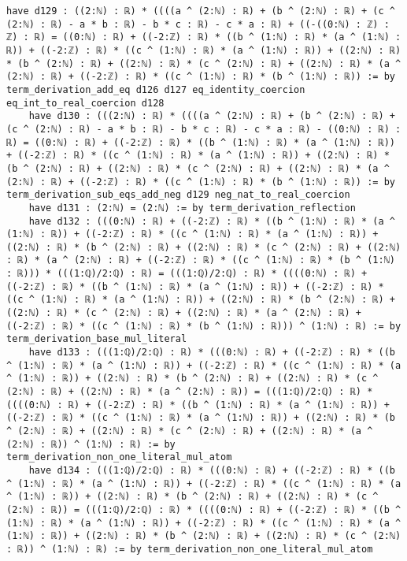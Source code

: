 \documentclass{article}
\begin{document}
\begin{tcolorbox}[colback=white!10, width=\linewidth]
\begin{lstlisting}[language=Lean4]
    have d129 : ((2:ℕ) : ℝ) * ((((a ^ (2:ℕ) : ℝ) + (b ^ (2:ℕ) : ℝ) + (c ^ (2:ℕ) : ℝ) - a * b : ℝ) - b * c : ℝ) - c * a : ℝ) + ((-((0:ℕ) : ℤ) : ℤ) : ℝ) = ((0:ℕ) : ℝ) + ((-2:ℤ) : ℝ) * ((b ^ (1:ℕ) : ℝ) * (a ^ (1:ℕ) : ℝ)) + ((-2:ℤ) : ℝ) * ((c ^ (1:ℕ) : ℝ) * (a ^ (1:ℕ) : ℝ)) + ((2:ℕ) : ℝ) * (b ^ (2:ℕ) : ℝ) + ((2:ℕ) : ℝ) * (c ^ (2:ℕ) : ℝ) + ((2:ℕ) : ℝ) * (a ^ (2:ℕ) : ℝ) + ((-2:ℤ) : ℝ) * ((c ^ (1:ℕ) : ℝ) * (b ^ (1:ℕ) : ℝ)) := by term_derivation_add_eq d126 d127 eq_identity_coercion eq_int_to_real_coercion d128
    have d130 : (((2:ℕ) : ℝ) * ((((a ^ (2:ℕ) : ℝ) + (b ^ (2:ℕ) : ℝ) + (c ^ (2:ℕ) : ℝ) - a * b : ℝ) - b * c : ℝ) - c * a : ℝ) - ((0:ℕ) : ℝ) : ℝ) = ((0:ℕ) : ℝ) + ((-2:ℤ) : ℝ) * ((b ^ (1:ℕ) : ℝ) * (a ^ (1:ℕ) : ℝ)) + ((-2:ℤ) : ℝ) * ((c ^ (1:ℕ) : ℝ) * (a ^ (1:ℕ) : ℝ)) + ((2:ℕ) : ℝ) * (b ^ (2:ℕ) : ℝ) + ((2:ℕ) : ℝ) * (c ^ (2:ℕ) : ℝ) + ((2:ℕ) : ℝ) * (a ^ (2:ℕ) : ℝ) + ((-2:ℤ) : ℝ) * ((c ^ (1:ℕ) : ℝ) * (b ^ (1:ℕ) : ℝ)) := by term_derivation_sub_eqs_add_neg d129 neg_nat_to_real_coercion
    have d131 : (2:ℕ) = (2:ℕ) := by term_derivation_reflection
    have d132 : (((0:ℕ) : ℝ) + ((-2:ℤ) : ℝ) * ((b ^ (1:ℕ) : ℝ) * (a ^ (1:ℕ) : ℝ)) + ((-2:ℤ) : ℝ) * ((c ^ (1:ℕ) : ℝ) * (a ^ (1:ℕ) : ℝ)) + ((2:ℕ) : ℝ) * (b ^ (2:ℕ) : ℝ) + ((2:ℕ) : ℝ) * (c ^ (2:ℕ) : ℝ) + ((2:ℕ) : ℝ) * (a ^ (2:ℕ) : ℝ) + ((-2:ℤ) : ℝ) * ((c ^ (1:ℕ) : ℝ) * (b ^ (1:ℕ) : ℝ))) * (((1:ℚ)/2:ℚ) : ℝ) = (((1:ℚ)/2:ℚ) : ℝ) * ((((0:ℕ) : ℝ) + ((-2:ℤ) : ℝ) * ((b ^ (1:ℕ) : ℝ) * (a ^ (1:ℕ) : ℝ)) + ((-2:ℤ) : ℝ) * ((c ^ (1:ℕ) : ℝ) * (a ^ (1:ℕ) : ℝ)) + ((2:ℕ) : ℝ) * (b ^ (2:ℕ) : ℝ) + ((2:ℕ) : ℝ) * (c ^ (2:ℕ) : ℝ) + ((2:ℕ) : ℝ) * (a ^ (2:ℕ) : ℝ) + ((-2:ℤ) : ℝ) * ((c ^ (1:ℕ) : ℝ) * (b ^ (1:ℕ) : ℝ))) ^ (1:ℕ) : ℝ) := by term_derivation_base_mul_literal
    have d133 : (((1:ℚ)/2:ℚ) : ℝ) * (((0:ℕ) : ℝ) + ((-2:ℤ) : ℝ) * ((b ^ (1:ℕ) : ℝ) * (a ^ (1:ℕ) : ℝ)) + ((-2:ℤ) : ℝ) * ((c ^ (1:ℕ) : ℝ) * (a ^ (1:ℕ) : ℝ)) + ((2:ℕ) : ℝ) * (b ^ (2:ℕ) : ℝ) + ((2:ℕ) : ℝ) * (c ^ (2:ℕ) : ℝ) + ((2:ℕ) : ℝ) * (a ^ (2:ℕ) : ℝ)) = (((1:ℚ)/2:ℚ) : ℝ) * ((((0:ℕ) : ℝ) + ((-2:ℤ) : ℝ) * ((b ^ (1:ℕ) : ℝ) * (a ^ (1:ℕ) : ℝ)) + ((-2:ℤ) : ℝ) * ((c ^ (1:ℕ) : ℝ) * (a ^ (1:ℕ) : ℝ)) + ((2:ℕ) : ℝ) * (b ^ (2:ℕ) : ℝ) + ((2:ℕ) : ℝ) * (c ^ (2:ℕ) : ℝ) + ((2:ℕ) : ℝ) * (a ^ (2:ℕ) : ℝ)) ^ (1:ℕ) : ℝ) := by term_derivation_non_one_literal_mul_atom
    have d134 : (((1:ℚ)/2:ℚ) : ℝ) * (((0:ℕ) : ℝ) + ((-2:ℤ) : ℝ) * ((b ^ (1:ℕ) : ℝ) * (a ^ (1:ℕ) : ℝ)) + ((-2:ℤ) : ℝ) * ((c ^ (1:ℕ) : ℝ) * (a ^ (1:ℕ) : ℝ)) + ((2:ℕ) : ℝ) * (b ^ (2:ℕ) : ℝ) + ((2:ℕ) : ℝ) * (c ^ (2:ℕ) : ℝ)) = (((1:ℚ)/2:ℚ) : ℝ) * ((((0:ℕ) : ℝ) + ((-2:ℤ) : ℝ) * ((b ^ (1:ℕ) : ℝ) * (a ^ (1:ℕ) : ℝ)) + ((-2:ℤ) : ℝ) * ((c ^ (1:ℕ) : ℝ) * (a ^ (1:ℕ) : ℝ)) + ((2:ℕ) : ℝ) * (b ^ (2:ℕ) : ℝ) + ((2:ℕ) : ℝ) * (c ^ (2:ℕ) : ℝ)) ^ (1:ℕ) : ℝ) := by term_derivation_non_one_literal_mul_atom

\end{lstlisting}
\end{tcolorbox}
\end{document}
